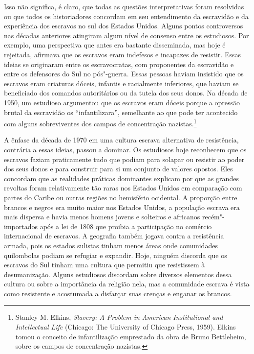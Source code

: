Isso não significa, é claro, que todas as questões interpretativas foram
resolvidas ou que todos os historiadores concordam em seu entendimento
da escravidão e da experiência dos escravos no sul dos Estados Unidos.
Alguns pontos controversos nas décadas anteriores atingiram algum nível
de consenso entre os estudiosos. Por exemplo, uma perspectiva que antes
era bastante disseminada, mas hoje é rejeitada, afirmava que os escravos
eram indefesos e incapazes de resistir. Essas ideias se originaram entre
os escravocratas, com proponentes da escravidão e entre os defensores do
Sul no pós"-guerra. Essas pessoas haviam insistido que os escravos eram
criaturas dóceis, infantis e racialmente inferiores, que haviam se
beneficiado dos comandos autoritários ou da tutela dos seus donos. Na
década de 1950, um estudioso argumentou que os escravos eram dóceis
porque a opressão brutal da escravidão os ``infantilizara'', semelhante
ao que pode ter acontecido com alguns sobreviventes dos campos de
concentração nazistas.\footnote{Stanley M. Elkins, \emph{Slavery: A
  Problem in American Institutional and Intellectual Life} (Chicago: The
  University of Chicago Press, 1959). Elkins tomou o conceito de
  infantilização emprestado da obra de Bruno Bettleheim, sobre os campos
  de concentração nazistas.}

A ênfase da década de 1970 em uma cultura escrava alternativa de
resistência, contrária a essas ideias, passou a dominar. Os estudiosos
hoje reconhecem que os escravos faziam praticamente tudo que podiam para
solapar ou resistir ao poder dos seus donos e para construir para si um
conjunto de valores opostos. Eles concordam que as realidades práticas
dominantes explicam por que as grandes revoltas foram relativamente tão
raras nos Estados Unidos em comparação com partes do Caribe ou outras
regiões no hemisfério ocidental. A proporção entre brancos e negros era
muito maior nos Estados Unidos, a população escrava era mais dispersa e
havia menos homens jovens e solteiros e africanos recém"-importados após
a lei de 1808 que proibia a participação no comércio internacional de
escravos. A geografia também jogava contra a resistência armada, pois os
estados sulistas tinham menos áreas onde comunidades quilombolas podiam
se refugiar e expandir. Hoje, ninguém discorda que os escravos do Sul
tinham uma cultura que permitiu que resistissem à desumanização. Alguns
estudiosos discordam sobre diversos elementos dessa cultura ou sobre a
importância da religião nela, mas a comunidade escrava é vista como
resistente e acostumada a disfarçar suas crenças e enganar os brancos.

